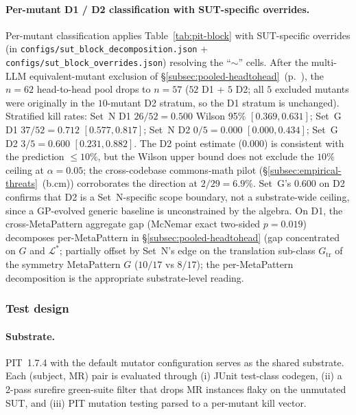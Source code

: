 \documentclass[acmsmall,screen,review]{acmart}
\begin{document}
\paragraph{Per-mutant D1 / D2 classification with SUT-specific overrides.}
Per-mutant classification applies Table~\ref{tab:pit-block} with SUT-specific overrides (in \texttt{configs/sut\_block\_decomposition.json} + \texttt{configs/sut\_block\_overrides.json}) resolving the ``$\sim$'' cells. After the multi-LLM equivalent-mutant exclusion of \S\ref{subsec:pooled-headtohead}~(p.~\pageref{para:eq-mutant-footnote}), the $n = 62$ head-to-head pool drops to $n = 57$ ($52$ D1 + $5$ D2; all $5$ excluded mutants were originally in the $10$-mutant D2 stratum, so the D1 stratum is unchanged). Stratified kill rates: Set~N D1 $26/52 = 0.500$ Wilson 95\% $[0.369, 0.631]$; Set~G D1 $37/52 = 0.712$ $[0.577, 0.817]$; Set~N D2 $0/5 = 0.000$ $[0.000, 0.434]$; Set~G D2 $3/5 = 0.600$ $[0.231, 0.882]$. The D2 point estimate ($0.000$) is consistent with the prediction $\le 10\%$, but the Wilson upper bound does not exclude the $10\%$ ceiling at $\alpha = 0.05$; the cross-codebase commons-math pilot (\S\ref{subsec:empirical-threats}~(b.cm)) corroborates the direction at $2/29 = 6.9\%$. Set~G's $0.600$ on D2 confirms that D2 is a Set~N-specific scope boundary, not a substrate-wide ceiling, since a GP-evolved generic baseline is unconstrained by the algebra. On D1, the cross-MetaPattern aggregate gap (McNemar exact two-sided $p = 0.019$) decomposes per-MetaPattern in \S\ref{subsec:pooled-headtohead} (gap concentrated on $G$ and $\mathcal{L}^{*}$; partially offset by Set~N's edge on the translation sub-class $G_{\mathrm{tr}}$ of the symmetry MetaPattern $G$ ($10/17$ vs $8/17$); the per-MetaPattern decomposition is the appropriate substrate-level reading.

\subsubsection{Test design}
\label{subsec:test-design}

\paragraph{Substrate.}
PIT~1.7.4 with the default mutator configuration serves as the
shared substrate. Each (subject, MR) pair is evaluated through (i)
JUnit test-class codegen, (ii) a 2-pass surefire green-suite filter
that drops MR instances flaky on the unmutated SUT, and (iii) PIT
mutation testing parsed to a per-mutant kill vector.
\end{document}
